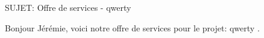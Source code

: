 SUJET: Offre de services - qwerty \par Bonjour Jérémie, voici notre offre de services pour le projet: qwerty .